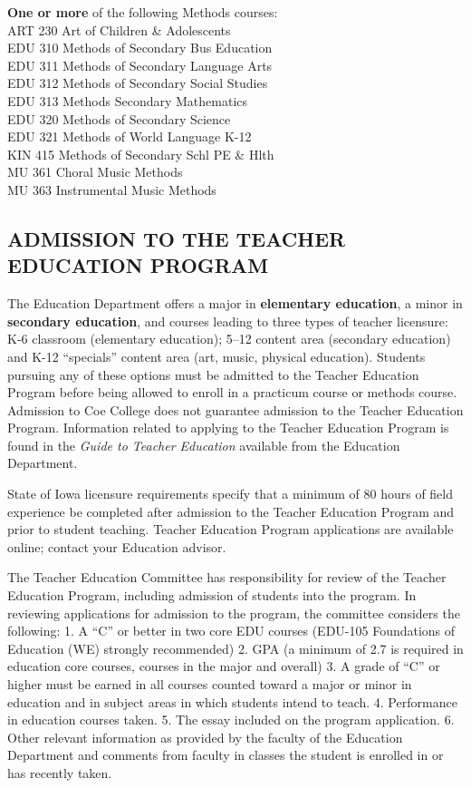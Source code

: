 \documentclass[
  letterpaper,
]{scrbook}
\begin{document}
\begin{enumerate}
  \textbf{One or more} of the following Methods courses:\\
  ART 230 Art of Children \& Adolescents\\
  EDU 310 Methods of Secondary Bus Education\\
  EDU 311 Methods of Secondary Language Arts\\
  EDU 312 Methods of Secondary Social Studies\\
  EDU 313 Methods Secondary Mathematics\\
  EDU 320 Methods of Secondary Science\\
  EDU 321 Methods of World Language K-12\\
  KIN 415 Methods of Secondary Schl PE \& Hlth\\
  MU 361 Choral Music Methods\\
  MU 363 Instrumental Music Methods
\end{enumerate}

\subsection{ADMISSION TO THE TEACHER EDUCATION
PROGRAM}\label{admission-to-the-teacher-education-program}

The Education Department offers a major in \textbf{elementary
education}, a minor in \textbf{secondary education}, and courses leading
to three types of teacher licensure: K-6 classroom (elementary
education); 5--12 content area (secondary education) and K-12
``specials'' content area (art, music, physical education). Students
pursuing any of these options must be admitted to the Teacher Education
Program before being allowed to enroll in a practicum course or methods
course. Admission to Coe College does not guarantee admission to the
Teacher Education Program. Information related to applying to the
Teacher Education Program is found in the \emph{Guide to Teacher
Education} available from the Education Department.

State of Iowa licensure requirements specify that a minimum of 80 hours
of field experience be completed after admission to the Teacher
Education Program and prior to student teaching. Teacher Education
Program applications are available online; contact your Education
advisor.

The Teacher Education Committee has responsibility for review of the
Teacher Education Program, including admission of students into the
program. In reviewing applications for admission to the program, the
committee considers the following: 1. A ``C'' or better in two core EDU
courses (EDU-105 Foundations of Education (WE) strongly recommended) 2.
GPA (a minimum of 2.7 is required in education core courses, courses in
the major and overall) 3. A grade of ``C'' or higher must be earned in
all courses counted toward a major or minor in education and in subject
areas in which students intend to teach. 4. Performance in education
courses taken. 5. The essay included on the program application. 6.
Other relevant information as provided by the faculty of the Education
Department and comments from faculty in classes the student is enrolled
in or has recently taken.
\end{document}

